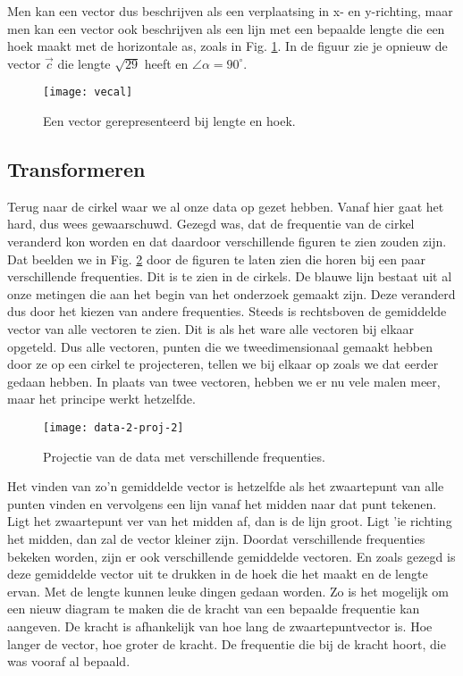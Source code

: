\documentclass[11pt,fleqn]{book} %
\begin{document}
Men kan een vector dus beschrijven als een verplaatsing in x- en y-richting, maar men kan een vector ook beschrijven als een lijn met een bepaalde lengte die een hoek maakt met de horizontale as, zoals in Fig. \ref{fig:vecal}. In de figuur zie je opnieuw de vector $\vec{c}$ die lengte $\sqrt{29}$ heeft en $\angle \alpha = 90^\circ$.

\begin{figure}[h]
	\centering\texttt{[image: vecal]}
	\caption{Een vector gerepresenteerd bij lengte en hoek.}
	\label{fig:vecal}
\end{figure}

\subsection{Transformeren}
Terug naar de cirkel waar we al onze data op gezet hebben. Vanaf hier gaat het hard, dus wees gewaarschuwd. Gezegd was, dat de frequentie van de cirkel veranderd kon worden en dat daardoor verschillende figuren te zien zouden zijn. Dat beelden we in Fig. \ref{fig:data-2-proj-2} door de figuren te laten zien die horen bij een paar verschillende frequenties. Dit is te zien in de cirkels. De blauwe lijn bestaat uit al onze metingen die aan het begin van het onderzoek gemaakt zijn. Deze veranderd dus door het kiezen van andere frequenties. Steeds is rechtsboven de gemiddelde vector van alle vectoren te zien. Dit is als het ware alle vectoren bij elkaar opgeteld. Dus alle vectoren, punten die we tweedimensionaal gemaakt hebben door ze op een cirkel te projecteren, tellen we bij elkaar op zoals we dat eerder gedaan hebben. In plaats van twee vectoren, hebben we er nu vele malen meer, maar het principe werkt hetzelfde.

\begin{figure}[h]
	\centering\texttt{[image: data-2-proj-2]}
	\caption{Projectie van de data met verschillende frequenties.}
	\label{fig:data-2-proj-2}
\end{figure}

Het vinden van zo’n gemiddelde vector is hetzelfde als het zwaartepunt van alle punten vinden en vervolgens een lijn vanaf het midden naar dat punt tekenen. Ligt het zwaartepunt ver van het midden af, dan is de lijn groot. Ligt 'ie richting het midden, dan zal de vector kleiner zijn. Doordat verschillende frequenties bekeken worden, zijn er ook verschillende gemiddelde vectoren. En zoals gezegd is deze gemiddelde vector uit te drukken in de hoek die het maakt en de lengte ervan. Met de lengte kunnen leuke dingen gedaan worden. Zo is het mogelijk om een nieuw diagram te maken die de kracht van een bepaalde frequentie kan aangeven. De kracht is afhankelijk van hoe lang de zwaartepuntvector is. Hoe langer de vector, hoe groter de kracht. De frequentie die bij de kracht hoort, die was vooraf al bepaald.
\end{document}
